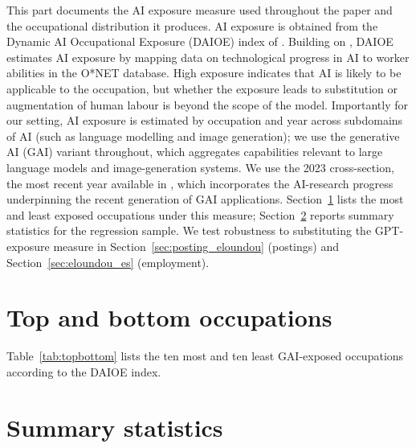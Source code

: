 \documentclass[preprint,12pt,authoryear]{elsarticle}
\begin{document}
This part documents the AI exposure measure used throughout the paper and the occupational distribution it produces. AI exposure is obtained from the Dynamic AI Occupational Exposure (DAIOE) index of \citet{engberg2024daioe}. Building on \citet{felten2018method,felten2021occupational}, DAIOE estimates AI exposure by mapping data on technological progress in AI to worker abilities in the O*NET database. High exposure indicates that AI is likely to be applicable to the occupation, but whether the exposure leads to substitution or augmentation of human labour is beyond the scope of the model. Importantly for our setting, AI exposure is estimated by occupation and year across subdomains of AI (such as language modelling and image generation); we use the generative AI (GAI) variant throughout, which aggregates capabilities relevant to large language models and image-generation systems. We use the 2023 cross-section, the most recent year available in \citet{engberg2024daioe}, which incorporates the AI-research progress underpinning the recent generation of GAI applications. Section~\ref{sec:topbottom} lists the most and least exposed occupations under this measure; Section~\ref{sec:summary} reports summary statistics for the regression sample. We test robustness to substituting the \citet{eloundou2024gpts} GPT-exposure measure in Section~\ref{sec:posting_eloundou} (postings) and Section~\ref{sec:eloundou_es} (employment).


\section{Top and bottom occupations}
\label{sec:topbottom}

Table~\ref{tab:topbottom} lists the ten most and ten least GAI-exposed occupations according to the DAIOE index.




\section{Summary statistics}
\label{sec:summary}
\end{document}
